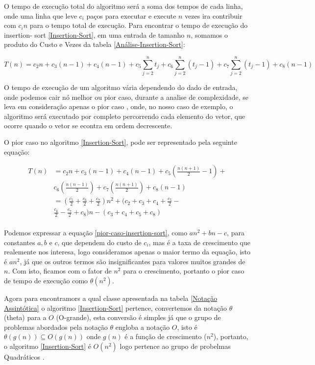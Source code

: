 \documentclass[
	12pt,				%
	openright,			%
	oneside,			%
	a4paper,			%
	english,			%
	brazil				%
	]{abntex2}
\begin{document}
O tempo de execução total do algoritmo será a soma dos tempos de cada linha, onde uma linha que leve $c_i$ paços para executar
e execute $n$ vezes ira contribuir com $c_in$ para o tempo total de execução. Para encontrar o tempo de execução do insertion-
sort \ref{Insertion-Sort}, em uma entrada de tamanho $n$, somamos o produto do Custo e Vezes da tabela \ref{Análise-Insertion-Sort}:

\begin{equation}
	\label{tempo-execução-insertion-sort}
	T(n) = c_2n + c_3(n - 1) + c_4(n - 1) + c_5\sum_{j=2}^{n} t_j + c_6\sum_{j=2}^{n} (t_j - 1) + c_7\sum_{j=2}^{n} (t_j - 1) + c_8(n-1)
\end{equation}

O tempo de execução de um algoritmo vária dependendo do dado de entrada, onde podemos cair nó melhor ou pior caso, durante a
analise de complexidade, se leva em consideração apenas o pior caso \cite{introductionAlgorthms}, onde, no nosso caso de exemplo, 
o algoritmo será executado por completo percorrendo cada elemento do vetor, que ocorre quando o vetor se econtra em ordem decrescente.

O pior caso no algoritmo \ref{Insertion-Sort}, pode ser representado pela seguinte equação:

\begin{equation}
	\label{pior-caso-insertion-sort}
	\begin{split}
		T(n)&= c_2n + c_3(n - 1) + c_4(n - 1) + c_5(\frac{n(n+1)}{2}-1) + \\ 
			&c_6(\frac{n(n-1)}{2}) + c_7(\frac{n(n+1)}{2}) + c_8(n-1) \\
			&= (\frac{c_5}{2} + \frac{c_6}{2} + \frac{c_7}{2})n^2 + (c_2 + c_3 + c_4 + \frac{c_5}{2} - \\
			&\frac{c_6}{2} - \frac{c_7}{2} + c_8)n - (c_3 + c_4 + c_5 + c_8) \\
	\end{split}
\end{equation}

Podemos expressar a equação \ref{pior-caso-insertion-sort}, como $an^2 + bn - c$, para constantes $a, b$ e $c$, que dependem do custo de
$c_i$, mas é a taxa de crescimento que realemente nos interesa, logo consideramos apenas o maior termo da equação, isto é $an^2$, já que
os outros termos são insignificantes para valores muitos grandes de $n$. Com isto, ficamos com o fator de $n^2$ para o crescimento, portanto
o pior caso de tempo de execução como $\theta(n^2)$.

Agora para encontramors a qual classe apresentada na tabela \ref{Notação Assintótica} o algoritmo \ref{Insertion-Sort} pertence, convertemos
da notação $\theta$ (theta) para a $O$ (O-grande), esta conversão é simples já que o grupo de problemas abordados pela notação $\theta$ engloba
a notação $O$, isto é $\theta(g(n)) \subseteq O(g(n))$ onde $g(n)$ é a função de crescimento ($n^2$), portanto, o algoritmo \ref{Insertion-Sort}
é $O(n^2)$ logo pertence ao grupo de probelmas Quadráticos \cite{introductionAlgorthms}.
\end{document}
